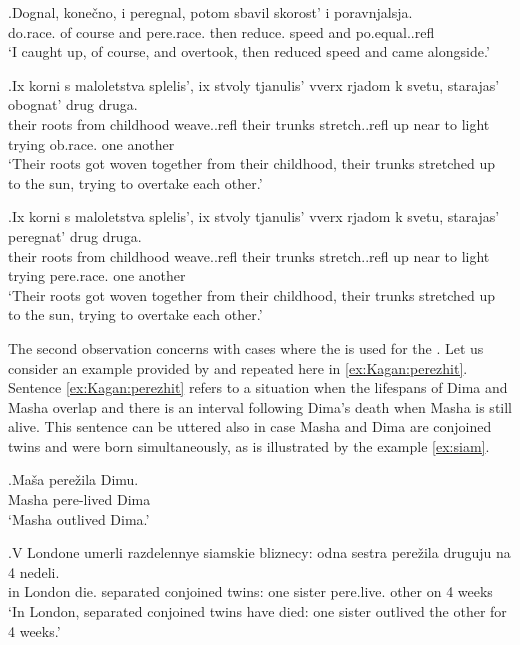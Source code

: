 \exg.\label{ex:comparison:peregnat}Dognal, kone\v{c}no, i peregnal, potom sbavil skorost' i poravnjalsja.\\
do.race. {of course} and pere.race. then reduce. speed and po.equal..refl\\
\trans `I caught up, of course, and overtook, then reduced speed and came alongside.'

\exg.\label{ex:comparison:obognat}Ix korni s maloletstva splelis', ix stvoly tjanulis' vverx rjadom k svetu, starajas' obognat' drug druga.\\
their roots from childhood weave..refl their trunks stretch..refl up near to light trying ob.race. one another\\
\trans `Their roots got woven together from their childhood, their trunks stretched up to the sun, trying to overtake each other.'\\

\exg.\label{ex:peregnat}Ix korni s maloletstva splelis', ix stvoly tjanulis' vverx rjadom k svetu, starajas' peregnat' drug druga.\\
their roots from childhood weave..refl their trunks stretch..refl up near to light trying pere.race. one another\\
\trans `Their roots got woven together from their childhood, their trunks stretched up to the sun, trying to overtake each other.'

The second observation concerns with cases where the  is used for the . Let us consider an example provided by \citet[142]{Kagan:book} and repeated here in \ref{ex:Kagan:perezhit}. Sentence \ref{ex:Kagan:perezhit} refers to a situation when the lifespans of Dima and Masha overlap and there is an interval following Dima's death when Masha is still alive. This sentence can be uttered also in case Masha and Dima are conjoined twins and were born simultaneously, as is illustrated by the example \ref{ex:siam}.

\exg.\label{ex:Kagan:perezhit}Ma\v{s}a pere\v{z}ila Dimu.\\
Masha pere-lived Dima\\
\trans `Masha outlived Dima.'

\exg.\label{ex:siam}V Londone umerli razdelennye siamskie bliznecy: odna sestra pere\v{z}ila druguju na 4 nedeli.\\
in London die. separated conjoined twins: one sister pere.live. other on 4 weeks\\
\trans `In London, separated conjoined twins have died: one sister outlived the other for 4 weeks.'

